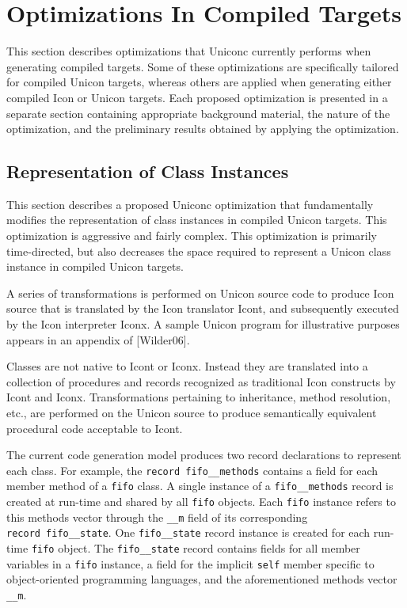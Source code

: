 \section{Optimizations In Compiled Targets}

This section describes optimizations that Uniconc currently performs
when generating compiled targets. Some of these optimizations are
specifically tailored for compiled Unicon targets, whereas others are
applied when generating either compiled Icon or Unicon targets. Each
proposed optimization is presented in a separate section containing
appropriate background material, the nature of the optimization, and
the preliminary results obtained by applying the optimization.


\label{ch:Opts In Generated Code}
\subsection{Representation of Class Instances}
\label{sect:Representing Objects}

This section describes a proposed Uniconc optimization that fundamentally
modifies the representation of class instances in compiled Unicon targets. This
optimization is aggressive and fairly complex. This optimization is primarily
\mbox{time-directed}, but also decreases the space required to represent a
Unicon class instance in compiled Unicon targets.

A series of transformations is performed on Unicon source code to produce Icon
source that is translated by the Icon translator Icont, and subsequently
executed by the Icon interpreter Iconx.  A sample Unicon program for
illustrative purposes appears in an appendix of [Wilder06].

Classes are not native to Icont or Iconx. Instead they are translated
into a collection of procedures and records recognized as
traditional Icon constructs by Icont and Iconx.  Transformations pertaining to
inheritance, method resolution, etc., are performed on the Unicon source to
produce semantically equivalent procedural code acceptable to Icont.

The current code
generation model produces two record declarations to represent each
class. For example, the \texttt{record~fifo\_\_methods} contains a field for
each member method of a \texttt{fifo} class. A single instance of a
\texttt{fifo\_\_methods} record is created at \mbox{run-time} and shared by all
\texttt{fifo} objects.  Each \texttt{fifo} instance refers to this methods
vector through the \texttt{\_\_m} field of its corresponding
\texttt{record~fifo\_\_state}. One \texttt{fifo\_\_state} record instance is
created for each \mbox{run-time} \texttt{fifo} object. The \texttt{fifo\_\_state} record
contains fields for all member variables in a \texttt{fifo} instance, a field
for the implicit \texttt{self} member specific to object-oriented programming
languages, and the aforementioned methods vector \texttt{\_\_m}.


